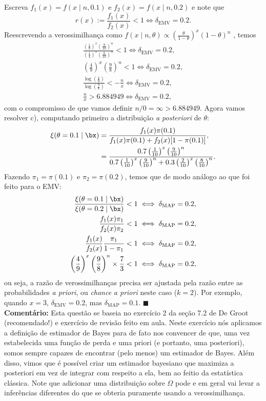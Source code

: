 {Escreva $f_1(x) = f(x \mid n, 0.1)$ e $f_2(x) = f(x \mid n, 0.2)$ e note que
\begin{equation*}
    r(x) := \frac{f_1(x)}{f_2(x)} < 1 \iff \delta_{\textrm{EMV}} = 0.2.
\end{equation*}
Reescrevendo a verossimilhança como  $f(x \mid n, \theta) \propto (\frac{\theta}{1-\theta})^x(1-\theta)^n$ , temos
\begin{align*}
    \frac{(\frac{1}{9})^x(\frac{9}{10})^n}{(\frac{1}{4})^x(\frac{8}{10})^n} < 1 \iff \delta_{\textrm{EMV}} = 0.2,\\
    \left(\frac{4}{9}\right)^x\left(\frac{9}{8}\right)^n < 1 \iff \delta_{\textrm{EMV}} = 0.2,\\
    \frac{\log\left(\frac{4}{9}\right)}{\log\left(\frac{9}{8}\right)} < -\frac{n}{x} \iff \delta_{\textrm{EMV}} = 0.2,\\
        \frac{n}{x} > 6.884949 \iff \delta_{\textrm{EMV}} = 0.2,
\end{align*}
com o compromisso de que vamos definir $n/0 = \infty > 6.884949$.
Agora vamos resolver c), computando primeiro a distribuição \textit{a posteriori} de $\theta$:
\begin{align*}
    \xi(\theta = 0.1 \mid \bx) &= \frac{f_1(x)\pi(0.1)}{f_1(x)\pi(0.1) + f_2(x)[1-\pi(0.1)]},\\
    &= \frac{0.7\left(\frac{1}{10}\right)^x \left(\frac{9}{10}\right)^n}{0.7\left(\frac{1}{10}\right)^x \left(\frac{9}{10}\right)^n + 0.3\left(\frac{2}{10}\right)^x \left(\frac{8}{10}\right)^n}.
\end{align*}
Fazendo $\pi_1 = \pi(0.1)$ e $\pi_2 = \pi(0.2)$, temos que de modo análogo ao que foi feito para o EMV: 
\begin{align*}
\frac{\xi(\theta = 0.1 \mid \bx)}{  \xi(\theta = 0.2 \mid \bx)}< 1 \iff \delta_{\textrm{MAP}} = 0.2,\\
\frac{f_1(x)\pi_1}{f_2(x)\pi_2}< 1 \iff \delta_{\textrm{MAP}} = 0.2,\\
\frac{f_1(x)}{f_2(x)}\frac{\pi_1}{1-\pi_1}< 1 \iff \delta_{\textrm{MAP}} = 0.2,\\
  \left(\frac{4}{9}\right)^x\left(\frac{9}{8}\right)^n \times \frac{7}{3}< 1 \iff \delta_{\textrm{MAP}} = 0.2,
\end{align*}
ou seja, a razão de verossimilhanças precisa ser ajustada pela razão entre as probabilidades \textit{a priori}, ou \textit{chance} \textit{a priori} neste caso ($k=2$).
Por exemplo, quando $x=3$, $\delta_{\textrm{EMV}} = 0.2$, mas $\delta_{\textrm{MAP}}  = 0.1$.
$\blacksquare$\\
\textbf{Comentário:}
Esta questão se baseia no exercício 2 da seção 7.2 de De Groot (recomendado!) e exercício de revisão feito em aula.
Neste exercício nós aplicamos a definição de estimador de Bayes para de fato nos convencer de que, uma vez estabelecida uma função de perda e uma priori (e portanto, uma posteriori), somos sempre capazes de encontrar (pelo menos) um estimador de Bayes.
Além disso, vimos que é possível criar um estimador bayesiano que maximiza a posteriori em vez de integrar com respeito a ela, bem ao feitio da estatística clássica.
Note que adicionar uma distribuição sobre $\Omega$ pode e em geral vai levar a inferências diferentes do que se obteria puramente usando a verossimilhança.
}